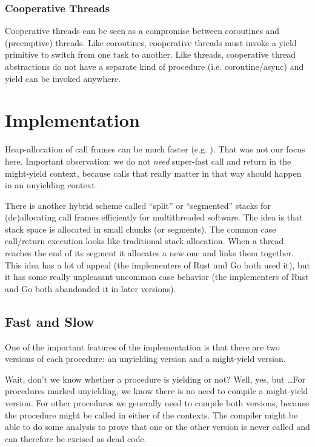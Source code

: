 \documentclass[11pt,preprint]{sigplanconf}
\begin{document}
\subsubsection{Cooperative Threads}

Cooperative threads can be seen as a compromise between coroutines and (preemptive) threads.
Like coroutines, cooperative threads must invoke a yield primitive to switch from one task to another.
Like threads, cooperative thread abstractions do not have a separate kind of procedure (i.e. coroutine/async) and yield can be invoked anywhere.

\section{Implementation}

Heap-allocation of call frames can be much faster
(e.g. \cite{Shao2000}).  That was not our focus here.  Important
observation: we do not \emph{need} super-fast call and return in the
might-yield context, because calls that really matter in that way should
happen in an unyielding context.

There is another hybrid scheme called ``split'' or ``segmented'' stacks
for (de)allocating call frames efficiently for multithreaded software.
The idea is that stack space is allocated in small chunks (or segments).
The common case call/return execution looks like traditional stack
allocation.  When a thread reaches the end of its segment it allocates a
new one and links them together.  This idea has a lot of appeal (the
implementers of Rust and Go both used it), but it has some really
unpleasant uncommon case behavior (the implementers of Rust and Go both
abandonded it in later versions).

\subsection{Fast and Slow}

One of the important features of the implementation is that there are
two versions of each procedure: an unyielding version and a might-yield
version.

Wait, don't we know whether a procedure is yielding or not?  Well, yes,
but \ldots For procedures marked unyielding, we know there is no need to
compile a might-yield version.  For other procedures we generally need
to compile both versions, because the procedure might be called in
either of the contexts.  The compiler might be able to do some analysis
to prove that one or the other version is never called and can therefore
be excised as dead code.
\end{document}
